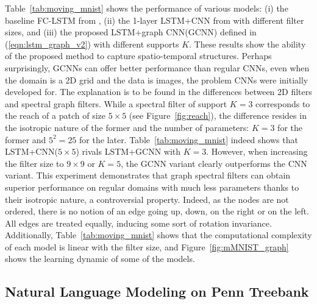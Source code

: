 \documentclass{article}
\newcommand{\figref}[1]{Figure~\ref{fig:#1}}
\newcommand{\tabref}[1]{Table~\ref{tab:#1}}
\newcommand{\eqnref}[1]{(\ref{eqn:#1})}
\begin{document}
\tabref{moving_mnist} shows the performance of various models: (i) the baseline
FC-LSTM from \citet{convlstm}, (ii) the 1-layer LSTM+CNN from \citet{convlstm}
with different filter sizes, and (iii) the proposed LSTM+graph CNN(GCNN)
defined in \eqnref{lstm_graph_v2} with different supports $K$. These results
show the ability of the proposed method to capture spatio-temporal structures.
Perhaps surprisingly, GCNNs can offer better performance than regular CNNs,
even when the domain is a 2D grid and the data is images, the problem CNNs were
initially developed for. The explanation is to be found in the differences
between 2D filters and spectral graph filters. While a spectral filter of
support $K=3$ corresponds to the reach of a patch of size $5 \times 5$ (see
\figref{reach}), the difference resides in the isotropic nature of the former
and the number of parameters: $K=3$ for the former and $5^2=25$ for the later.
\tabref{moving_mnist} indeed shows that LSTM+CNN($5\times5$) rivals LSTM+GCNN
with $K=3$. However, when increasing the filter size to $9\times9$ or $K=5$,
the GCNN variant clearly outperforms the CNN variant. This experiment
demonstrates that graph spectral filters can obtain superior performance on
regular domains with much less parameters thanks to their isotropic nature, a
controversial property. Indeed, as the nodes are not ordered, there is no
notion of an edge going up, down, on the right or on the left. All edges are
treated equally, inducing some sort of rotation invariance. Additionally,
\tabref{moving_mnist} shows that the computational complexity of each model is
linear with the filter size, and \figref{mMNIST_graph} shows the learning
dynamic of some of the models.

\subsection{Natural Language Modeling on Penn Treebank}
\end{document}

